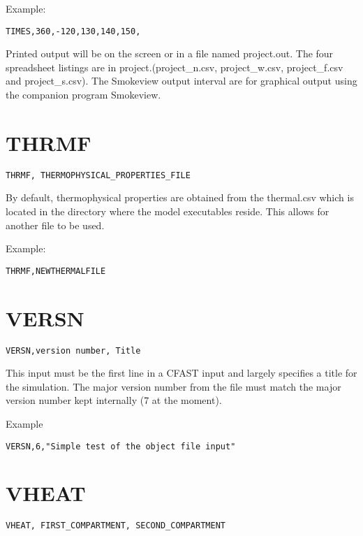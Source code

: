 Example:

\begin{lstlisting}
TIMES,360,-120,130,140,150,
\end{lstlisting}

Printed output will be on the screen or in a file named project.out. The four spreadsheet listings are in project.(project\_n.csv, project\_w.csv, project\_f.csv and project\_s.csv). The Smokeview output interval are for graphical output using the companion program Smokeview.

\section{THRMF}

\begin{lstlisting}
THRMF, THERMOPHYSICAL_PROPERTIES_FILE
\end{lstlisting}

By default, thermophysical properties are obtained from the thermal.csv which is located in the directory where the model executables reside. This allows for another file to be used.

Example:

\begin{lstlisting}
THRMF,NEWTHERMALFILE
\end{lstlisting}

\section{VERSN}

\begin{lstlisting}
VERSN,version number, Title
\end{lstlisting}

This input must be the first line in a CFAST input and largely specifies a title for the simulation. The major version number from the file must match the major version number kept internally (7 at the moment).

Example

\begin{lstlisting}
VERSN,6,"Simple test of the object file input"
\end{lstlisting}

\section{VHEAT}

\begin{lstlisting}
VHEAT, FIRST_COMPARTMENT, SECOND_COMPARTMENT
\end{lstlisting}

